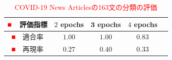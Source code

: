\documentclass[a4paper, twocolumn, 10pt]{jarticle}
\begin{document}
\begin{table}[H]
  \caption{
    \textcolor{red}{COVID-19 News Articlesの163文の分類の評価}
    }
  \centering
  {\tabcolsep=0.15cm
    \begin{tabular}{ccccp{6cm}}
    \hline
    \textcolor{red}{■~~}評価指標 & $2$ epochs & $\mathbf{3}$ \textbf{epochs} & $4$ epochs
    \\
    \hline
    \textcolor{red}{■~~}適合率 & $\mathbf{1.00}$ & $\mathbf{1.00}$ & $0.83$
    \\
    \textcolor{red}{■~~}再現率 & $0.27$ & $\mathbf{0.40}$ & $0.33$
    \\
    \hline
    \end{tabular}
  }
  \label{classification_evaluation}
\end{table}
\end{document}
